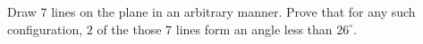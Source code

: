 Draw $7$ lines on the plane in an arbitrary manner. Prove that for any such configuration, $2$ of the those $7$ lines form an angle less than $26^{\circ}$.
